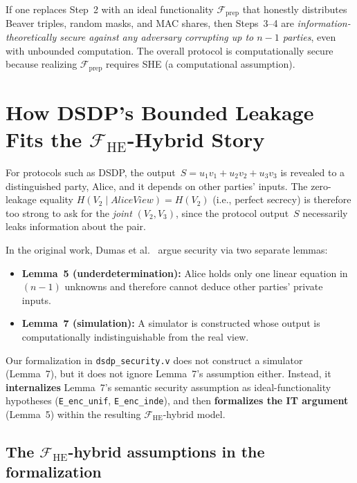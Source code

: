 \documentclass{article}
\begin{document}
If one replaces Step~2 with an ideal functionality $\mathcal{F}_{\mathrm{prep}}$ that honestly distributes Beaver triples, random masks, and MAC shares, then Steps~3--4 are \emph{information-theoretically secure against any adversary corrupting up to $n-1$ parties}, even with unbounded computation. The overall protocol is computationally secure because realizing $\mathcal{F}_{\mathrm{prep}}$ requires SHE (a computational assumption).

\section{How DSDP's Bounded Leakage Fits the $\mathcal{F}_{\mathrm{HE}}$-Hybrid Story}

For protocols such as DSDP, the output~$S = u_1 v_1 + u_2 v_2 + u_3 v_3$ is revealed to a distinguished party, Alice, and it depends on other parties' inputs. The zero-leakage equality $H(V_2 \mid \mathit{AliceView}) = H(V_2)$ (i.e., perfect secrecy) is therefore too strong to ask for the \emph{joint} $(V_2, V_3)$, since the protocol output~$S$ necessarily leaks information about the pair.

In the original work, Dumas et al.~\cite{dumas2017dual} argue security via two separate lemmas:
\begin{itemize}
  \item \textbf{Lemma~5 (underdetermination):} Alice holds only one linear equation in $(n{-}1)$ unknowns and therefore cannot deduce other parties' private inputs.
  \item \textbf{Lemma~7 (simulation):} A simulator is constructed whose output is computationally indistinguishable from the real view.
\end{itemize}

\noindent
Our formalization in \texttt{dsdp\_security.v} does not construct a simulator (Lemma~7), but it does not ignore Lemma~7's assumption either. Instead, it \textbf{internalizes} Lemma~7's semantic security assumption as ideal-functionality hypotheses (\texttt{E\_enc\_unif}, \texttt{E\_enc\_inde}), and then \textbf{formalizes the IT argument} (Lemma~5) within the resulting $\mathcal{F}_{\mathrm{HE}}$-hybrid model.

\subsection*{The $\mathcal{F}_{\mathrm{HE}}$-hybrid assumptions in the formalization}
\end{document}
